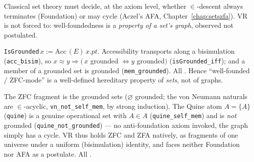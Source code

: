 Classical set theory must decide, at the axiom level, whether $\in$-descent
always terminates (Foundation) or may cycle (Aczel's AFA,
Chapter~\ref{chap:setszfa}).  VR is not forced to: well-foundedness is a
\emph{property of a set's graph}, observed not postulated.

\begin{theorem}
\label{thm:setsop_grounded}
\leanok
{}
\texttt{IsGrounded}\,$x := \mathrm{Acc}\,(E)\,x.\mathit{pt}$.  Accessibility
transports along a bisimulation (\texttt{acc\_bisim}), so
$x\approx y\Rightarrow(\,x$ grounded $\iff y$ grounded$)$
(\texttt{isGrounded\_iff}); and a member of a grounded set is grounded
(\texttt{mem\_grounded}).  All \axiomprofile{[]}.  Hence ``well-founded /
ZFC-mode'' is a well-defined hereditary property of \emph{sets}, not of graphs.
\end{theorem}

\begin{theorem}
\label{thm:setsop_fragments}
\leanok
{}
The ZFC fragment is the grounded sets ($\varnothing$ grounded; the von Neumann
naturals are $\in$-acyclic, \texttt{vn\_not\_self\_mem}, by strong induction).
The Quine atom $A=\{A\}$ (\texttt{quine}) is a genuine operational set with
$A\in A$ (\texttt{quine\_self\_mem}) and is \emph{not} grounded
(\texttt{quine\_not\_grounded}) --- no anti-foundation axiom invoked, the graph
simply has a cycle.  VR thus holds ZFC and ZFA natively, as fragments of one
universe under a uniform (bisimulation) identity, and faces neither Foundation
nor AFA as a postulate.  All \axiomprofile{[]}.
\end{theorem}

